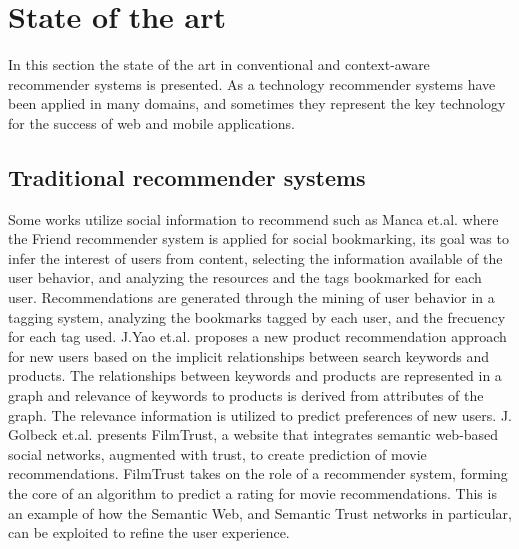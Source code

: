\chapter{State of the art} \label{stateoftheart}
In this section the state of the art in conventional and
context-aware recommender systems is presented. 
As a technology recommender systems have been applied 
in many domains, and sometimes they represent the  key
technology for the success of web and mobile applications.\\  
% 
\section{Traditional recommender systems} 
Some works utilize social information to recommend such
as Manca et.al.\cite{manca2014mining} where the Friend recommender
system is applied for social bookmarking, its goal was to
infer the interest of users from content, selecting the 
information available of the user behavior, and analyzing the resources and the
tags bookmarked for each user. Recommendations are generated
through the mining of user behavior in a tagging system, analyzing the
bookmarks tagged by each user, and the frecuency for each tag used. 
J.Yao et.al.\cite{yao2012product} proposes a new product recommendation
approach for new users based on the implicit relationships between
search keywords and products. The relationships between keywords and
products are represented in a graph and relevance of keywords to
products is derived from attributes of the graph.
The relevance
information is utilized to predict preferences of new users. J.
Golbeck et.al.\cite{golbeck2006filmtrust} presents FilmTrust, a
website that integrates semantic web-based social networks, augmented
with trust, to create prediction of movie recommendations. FilmTrust takes on
the role of a recommender system, forming the core of an algorithm to
predict a rating for movie recommendations. This is an example of
how the Semantic Web, and Semantic Trust networks in particular, can
be exploited to refine the user experience. \\  

